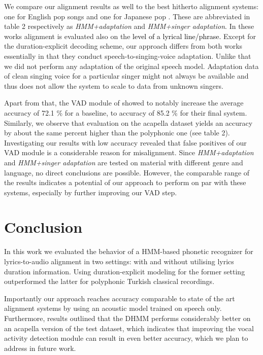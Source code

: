 \documentclass{article}
\begin{document}
We compare our alignment results as well to the best hitherto alignment systems: one for English pop
songs \cite{Mesaros96automaticalignment} and one for Japanese pop \cite{fujihara2011lyricsynchronizer}.
These are abbreviated in table 2 respectively as \emph{HMM+adaptation
}and \emph{HMM+singer adaptation}. In these works alignment is evaluated
also on the \textcolor{black}{level of a lyrical line/phrase.} Except
for the duration-explicit decoding scheme, our approach differs from
both works essentially in that they conduct speech-to-singing-voice
adaptation. Unlike that we did not perform any adaptation of the original
speech model. Adaptation data of clean singing voice for a particular
singer might not always be available and thus does not allow the system
to scale to data from unknown singers. 

Apart from that, the VAD module of \cite{fujihara2011lyricsynchronizer}  showed to notably
increase the average accuracy of 72.1 \% for a baseline, to accuracy
of 85.2 \% for their final system.  Similarly, we observe that evaluation on the acapella dataset yields an accuracy by
about the same percent higher than the polyphonic one (see table 2).
 Investigating our results with low accuracy revealed that false
positives of our VAD module is a considerable reason for misalignment.
Since \emph{HMM+adaptation} and \emph{HMM+singer adaptation} are tested on material with different genre and language, no direct conclusions are possible. However, the comparable range of the results indicates a potential of our approach to perform on par with these systems, especially by further improving our VAD step. 



\section{Conclusion}



In this work we evaluated the behavior of a HMM-based phonetic recognizer
for lyrics-to-audio alignment in two settings: with and without utilising
lyrics duration information. Using duration-explicit modeling for
the former setting outperformed the latter for polyphonic Turkish
classical recordings. 

Importantly our approach reaches accuracy comparable to state of the
art alignment systems by using an acoustic model trained on speech
only.  
Furthermore, results outlined that the DHMM performs considerably better on an acapella
version of the test dataset, which indicates that improving the vocal
activity detection module can result in even better accuracy, which we plan to address in future work. 
\end{document}
